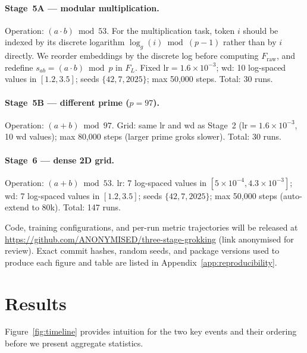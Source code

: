 \documentclass{article}
\newcommand{\flogit}{F_{L}}
\begin{document}
\paragraph{Stage~5A --- modular multiplication.}
Operation: $(a\cdot b)\bmod 53$.
For the multiplication task, token $i$ should be indexed by its discrete
logarithm $\log_g(i)\bmod(p{-}1)$ rather than by $i$ directly.
We reorder embeddings by the discrete log before computing $F_{\mathrm{raw}}$,
and redefine $s_{ab}=(a\cdot b)\bmod p$ in $\flogit$.
Fixed $\mathrm{lr}{=}1.6\times10^{-3}$; wd: 10 log-spaced values in
$[1.2, 3.5]$; seeds $\{42, 7, 2025\}$; max 50{,}000 steps.
Total: 30 runs.

\paragraph{Stage~5B --- different prime ($p{=}97$).}
Operation: $(a+b)\bmod 97$.
Grid: same lr and wd as Stage~2 (lr$=1.6\times10^{-3}$, 10 wd values);
max 80{,}000 steps (larger prime groks slower).
Total: 30 runs.

\paragraph{Stage~6 --- dense 2D grid.}
Operation: $(a+b)\bmod 53$.
lr: 7 log-spaced values in $[5\times10^{-4}, 4.3\times10^{-3}]$;
wd: 7 log-spaced values in $[1.2, 3.5]$;
seeds $\{42, 7, 2025\}$; max 50{,}000 steps (auto-extend to 80k).
Total: 147 runs.

Code, training configurations, and per-run metric trajectories will
be released at \url{https://github.com/ANONYMISED/three-stage-grokking}
(link anonymised for review).
Exact commit hashes, random seeds, and package versions used to
produce each figure and table are listed in
Appendix~\ref{app:reproducibility}.

\section{Results}
\label{sec:results}

Figure~\ref{fig:timeline} provides intuition for the two key
events and their ordering before we present aggregate statistics.
\end{document}
